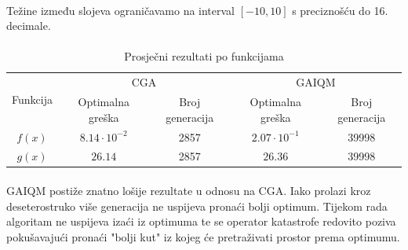 \documentclass[times, utf8, zavrsni, numeric]{fer}
\begin{document}
\paragraph{}
Težine između slojeva ograničavamo na interval $[-10, 10]$ s preciznošću do 16. decimale.

\paragraph{}
\begin{table}[htb]
\caption{Prosječni rezultati po funkcijama}
\centering
\begin{tabular}{|c|cc|cc|} \hline
\multirow{2}{*}{Funkcija} & \multicolumn{2}{c|}{CGA} & \multicolumn{2}{c|}{GAIQM} \\ \cline{2-5}
 & Optimalna greška & Broj generacija & Optimalna greška & Broj generacija \\ 
\hline
$f(x)$ & $8.14\cdot 10^{-2}$ & 2857 & $2.07\cdot 10^{-1}$ & 39998 \\
$g(x)$ & $26.14$ & 2857 & $26.36$ & 39998 \\
\hline
\end{tabular}
\end{table}

\paragraph{}
GAIQM postiže znatno lošije rezultate u odnosu na CGA. Iako prolazi kroz deseterostruko više generacija ne uspijeva pronaći bolji optimum. Tijekom rada algoritam ne uspijeva izaći iz optimuma te se operator katastrofe redovito poziva pokušavajući pronaći "bolji kut" iz kojeg će pretraživati prostor prema optimumu.
\end{document}

